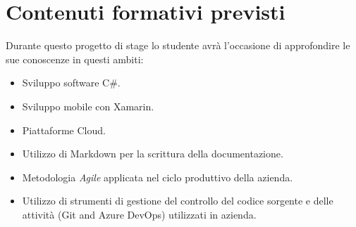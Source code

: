 \section*{Contenuti formativi previsti}
Durante questo progetto di stage lo studente avrà l'occasione di approfondire le sue conoscenze in questi ambiti:
\begin{itemize}
    \item Sviluppo software C\#.
    \item Sviluppo mobile con Xamarin.
    \item Piattaforme Cloud.
    \item Utilizzo di Markdown per la scrittura della documentazione.
    \item Metodologia \textit{Agile} applicata nel ciclo produttivo della azienda.
    \item Utilizzo di strumenti di gestione del controllo del codice sorgente e delle attività (Git and Azure DevOps) utilizzati in azienda.
\end{itemize}

\newpage